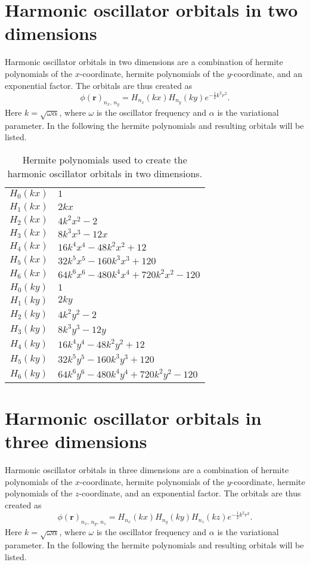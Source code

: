 \chapter{Harmonic oscillator orbitals in two dimensions}
	\label{sec:HOO_2D}
	Harmonic oscillator orbitals in two dimensions are a combination of hermite polynomials of the $x$-coordinate, hermite polynomials of the $y$-coordinate, and an exponential factor. The orbitals are thus created as
	\[
		\phi(\mathbf{r})_{n_{x},\,n_{y}}=H_{n_{x}}(kx)H_{n_{y}}(ky)e^{-\frac{1}{2}k^{2}r^{2}}.
	\]
	Here $k=\sqrt{\omega\alpha}$, where $\omega$ is the oscillator frequency and $\alpha$ is the variational parameter. In the following the hermite polynomials and resulting orbitals will be listed. \clearpage

	\begin{table}[H]
	\begin{centering}
		\begin{tabular}{c|l}
			$H_{0}(kx)$ & $1$  \tabularnewline
			$H_{1}(kx)$ & $2kx$  \tabularnewline
			$H_{2}(kx)$ & $4k^2x^2-2$  \tabularnewline
			$H_{3}(kx)$ & $8k^3x^3-12x$  \tabularnewline
			$H_{4}(kx)$ & $16k^4x^4-48k^2x^2+12$  \tabularnewline
			$H_{5}(kx)$ & $32k^5x^5-160k^3x^3+120$  \tabularnewline
			$H_{6}(kx)$ & $64k^6x^6-480k^4x^4+720k^2x^2-120$  \tabularnewline
			\hline
			$H_{0}(ky)$ & $1$  \tabularnewline
			$H_{1}(ky)$ & $2ky$  \tabularnewline
			$H_{2}(ky)$ & $4k^2y^2-2$  \tabularnewline
			$H_{3}(ky)$ & $8k^3y^3-12y$  \tabularnewline
			$H_{4}(ky)$ & $16k^4y^4-48k^2y^2+12$  \tabularnewline
			$H_{5}(ky)$ & $32k^5y^5-160k^3y^3+120$  \tabularnewline
			$H_{6}(ky)$ & $64k^6y^6-480k^4y^4+720k^2y^2-120$ \tabularnewline
		\end{tabular}%
	\par\end{centering}
	\protect\caption{Hermite polynomials used to create the harmonic oscillator orbitals in two dimensions.}
	\end{table}

	

\chapter{Harmonic oscillator orbitals in three dimensions}
	\label{sec:HOO_3D}
	Harmonic oscillator orbitals in three dimensions are a combination of hermite polynomials of the $x$-coordinate, hermite polynomials of the $y$-coordinate, hermite polynomials of the $z$-coordinate, and an exponential factor. The orbitals are thus created as
	\[
		\phi(\mathbf{r})_{n_{x},\,n_{y},\,n_{z}}=H_{n_{x}}(kx)H_{n_{y}}(ky)H_{n_{z}}(kz)e^{-\frac{1}{2}k^{2}r^{2}}.
	\]
	Here $k=\sqrt{\omega\alpha}$, where $\omega$ is the oscillator frequency and $\alpha$ is the variational parameter. In the following the hermite polynomials and resulting orbitals will be listed. \clearpage

